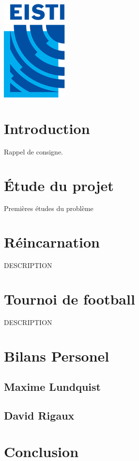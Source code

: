 \documentclass[12pt]{article}
\begin{document}
\begin{titlepage}
\includegraphics{Logo_EISTI.png}\\[1cm] %
 

\vfill %

\end{titlepage}

\tableofcontents
\newpage

\section{Introduction}

Rappel de consigne.

\section{Étude du projet}
Premières études du problème

\section{Réincarnation}
DESCRIPTION
\section{Tournoi de football}
DESCRIPTION
\section{Bilans Personel}
\subsection{Maxime Lundquist}
\subsection{David Rigaux}
\section{Conclusion}
\end{document}

